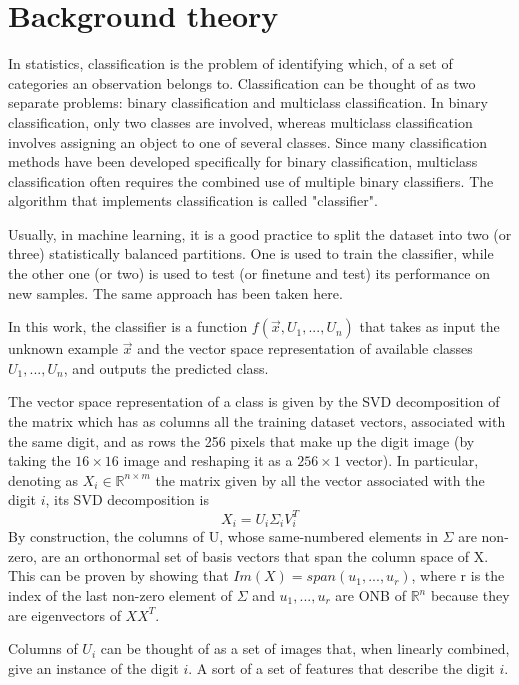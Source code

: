 \documentclass[a4paper,10pt]{report}
\begin{document}
\chapter{Background theory}\label{chap:background}
In statistics, classification is the problem of identifying which, of a set of categories an observation belongs to. 
Classification can be thought of as two separate problems: binary classification and multiclass classification. 
In binary classification, only two classes are involved, whereas multiclass classification involves assigning an object to one of several classes. 
Since many classification methods have been developed specifically for binary classification, multiclass classification often requires the combined use of multiple binary classifiers.
The algorithm that implements classification is called "classifier".

Usually, in machine learning, it is a good practice to split the dataset into two (or three) statistically balanced partitions. One is used to train the classifier, while the other one (or two) is used to test (or finetune and test) its performance on new samples.
The same approach has been taken here.

In this work, the classifier is a function $f(\vec{x}, U_1,...,U_n)$ that takes as input the unknown example $\vec{x}$ and the vector space representation of available classes $U_1,...,U_n$, and outputs the predicted class.

The vector space representation of a class is given by the SVD decomposition of the matrix which has as columns all the training dataset vectors, associated with the same digit, and as rows the 256 pixels that make up the digit image (by taking the $16\times16$ image and reshaping it as a $256\times1$ vector).
In particular, denoting as $X_{i} \in \mathbb{R}^{n\times m}$ the matrix given by all the vector associated with the digit $i$, its SVD decomposition is
\begin{equation}
  X_i = U_i\Sigma_i V^T_i
\end{equation}
By construction, the columns of U, whose same-numbered elements in $\Sigma$ are non-zero, are an orthonormal set of basis vectors that span the column space of X.
This can be proven by showing that $Im(X) = span(u_1,...,u_r)$, where r is the index of the last non-zero element of $\Sigma$ and $u_1,...,u_r$ are ONB of $\mathbb{R}^n$ because they are eigenvectors of $XX^T$.

Columns of $U_i$ can be thought of as a set of images that, when linearly combined, give an instance of the digit $i$. A sort of a set of features that describe the digit $i$.
\end{document}

